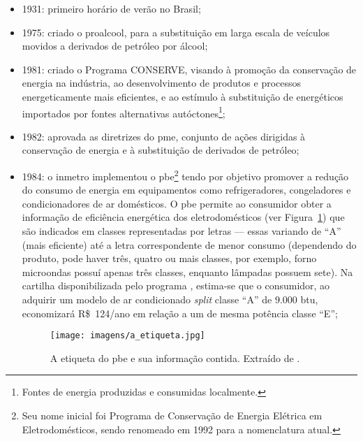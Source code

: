 \begin{itemize}
\item 1931: primeiro horário de verão no Brasil;
\item 1975: criado o \gls{proalcool}, para a substituição em larga
escala de veículos movidos a derivados de petróleo por álcool;
\item 1981: criado o Programa CONSERVE, visando à promoção da
conservação de energia na indústria, ao desenvolvimento de produtos e
processos energeticamente mais eficientes, e ao estímulo à
substituição de energéticos importados por fontes alternativas
autóctones\footnote{Fontes de energia produzidas e consumidas
localmente.};
\item 1982: aprovada as diretrizes do \gls{pme}, conjunto de ações
dirigidas à conservação de energia e à substituição de derivados de
petróleo;
\item 1984: o \gls{inmetro} implementou o \gls{pbe}\footnote{Seu nome
inicial foi Programa de Conservação de Energia Elétrica em
Eletrodomésticos, sendo renomeado em 1992 para a nomenclatura atual.}
tendo por objetivo promover a redução do consumo de energia em
equipamentos como refrigeradores, congeladores e condicionadores de ar
domésticos. O \gls{pbe} permite ao consumidor obter a informação de
eficiência energética dos eletrodomésticos (ver
Figura~\ref{fig:pbe_etiqueta}) que são indicados em classes
representadas por letras --- essas variando de ``A'' (mais eficiente)
até a letra correspondente de menor consumo (dependendo do produto,
pode haver três, quatro ou mais classes, por exemplo, forno microondas
possuí apenas três classes, enquanto lâmpadas possuem sete). Na
cartilha disponibilizada pelo programa \cite{pbe_cartilha}, estima-se
que o consumidor, ao adquirir um modelo de ar condicionado \emph{split}
classe ``A'' de 9.000 \acs{btu}, economizará R\$~124/ano em relação
a um de mesma potência classe ``E'';

\begin{figure}[h!t]
\centering
\texttt{[image: imagens/a\_etiqueta.jpg]}
\caption[A etiqueta do PBE.]
{A etiqueta do \gls{pbe} e sua informação contida. Extraído de
\cite{pbe_etiqueta}.}
\label{fig:pbe_etiqueta}
\end{figure}



\end{itemize}
